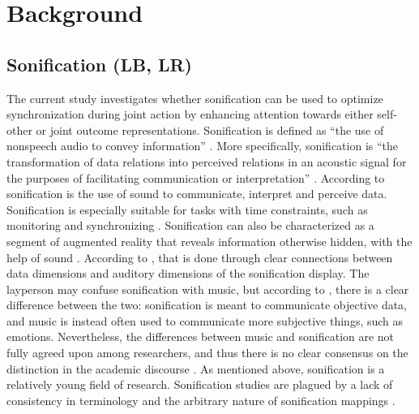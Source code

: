 \documentclass[10pt,a4paper,onecolumn]{article}
\begin{document}
\hypertarget{background}{%
\section{Background}\label{background}}

\hypertarget{sonification-lb-lr}{%
\subsection{Sonification (LB, LR)}\label{sonification-lb-lr}}

The current study investigates whether sonification can be used to optimize synchronization during joint action by enhancing attention towards either self-other or joint outcome representations. Sonification is defined as ``the use of nonspeech audio to convey information'' \autocite[p.~4]{kramerSonificationReportStatus1999}. More specifically, sonification is ``the transformation of data relations into perceived relations in an acoustic signal for the purposes of facilitating communication or interpretation'' \autocite[p.~4]{kramerSonificationReportStatus1999}. According to \textcite{dubusInteractiveSonificationMotion2013} sonification is the use of sound to communicate, interpret and perceive data. Sonification is especially suitable for tasks with time constraints, such as monitoring and synchronizing \autocite{dubusInteractiveSonificationMotion2013}. Sonification can also be characterized as a segment of augmented reality that reveals information otherwise hidden, with the help of sound \autocite{dubusInteractiveSonificationMotion2013}. According to \textcite{dubusInteractiveSonificationMotion2013}, that is done through clear connections between data dimensions and auditory dimensions of the sonification display. The layperson may confuse sonification with music, but according to \textcite{dubusInteractiveSonificationMotion2013}, there is a clear difference between the two: sonification is meant to communicate objective data, and music is instead often used to communicate more subjective things, such as emotions. Nevertheless, the differences between music and sonification are not fully agreed upon among researchers, and thus there is no clear consensus on the distinction in the academic discourse \autocite{dubusInteractiveSonificationMotion2013}. As mentioned above, sonification is a relatively young field of research. Sonification studies are plagued by a lack of consistency in terminology and the arbitrary nature of sonification mappings \autocite{dubusInteractiveSonificationMotion2013,dubusSystematicReviewMapping2013}.
\end{document}
